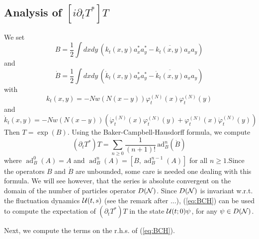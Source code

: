 \documentclass[11pt,a4paper,DIV11]{scrartcl}	%
\newcommand{\cU}{{\cal U}}
\newcommand{\cN}{{\cal N}}
\newcommand{\ad}{\operatorname{ad}}	%
\begin{document}
\subsection{Analysis of $[i \partial_t T^*] T$}

We set 
\[ B = \frac{1}{2} \int dx dy \, \left( k_t (x,y) a_x^* a_y^* - \overline{k_t (x,y)} a_x a_y \right) \]
and 
\[ \dot{B} =  \frac{1}{2} \int dx dy \, \left( \dot{k}_t (x,y) a_x^* a_y^* - \overline{\dot{k}_t (x,y)} a_x a_y \right) \]
with 
\[ k_t (x,y) = -N w(N(x-y)) \varphi_t^{(N)} (x) \varphi_t^{(N)} (y) \]
and
\[ \dot{k}_t (x,y) = - N w (N (x-y))  \left( \dot{\varphi}_t^{(N)} (x) \varphi_t^{(N)} (y) + \varphi_t^{(N)} (x) \dot{\varphi}_t^{(N)} (y) \right) \]
Then $T = \exp (B)$. Using the Baker-Campbell-Hausdorff formula, we compute
\begin{equation}\label{eq:BCH} \left(\partial_t T^* \right) T = \sum_{n \geq 0} \frac{1}{(n+1)!}\,  \text{ad}^n_{B} (\dot{B}) \end{equation}
where $\ad^0_B (A) = A$ and $\ad^n_B (A) = [B,\ad^{n-1}_B (A)]$ for all $n \geq 1$.Since the operators $B$ and $\dot{B}$ are unbounded, some care is needed one dealing with this formula. We will see however, that the series is absolute convergent on the domain of the number of particles operator $D(\cN)$. Since $D(\cN)$ is invariant w.r.t. the fluctuation dynamics $\cU (t,s)$ (see the remark after ...), (\ref{eq:BCH}) can be used to compute the expectation of $(\partial_t T^*) T$ in the state $\cU (t;0) \psi$, for any $\psi \in D(\cN)$. 

Next, we compute the terms on the r.h.s. of (\ref{eq:BCH}).
\end{document}
